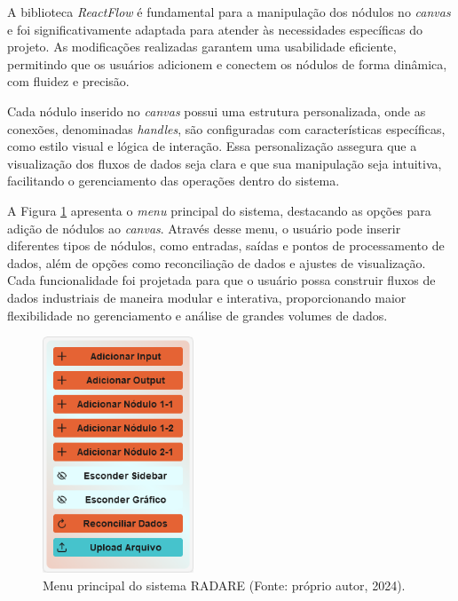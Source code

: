 A biblioteca \textit{ReactFlow} \cite{reactflow} é fundamental para a manipulação dos nódulos no \textit{canvas} e foi significativamente adaptada para atender às necessidades específicas do projeto. As modificações realizadas garantem uma usabilidade eficiente, permitindo que os usuários adicionem e conectem os nódulos de forma dinâmica, com fluidez e precisão.

Cada nódulo inserido no \textit{canvas} possui uma estrutura personalizada, onde as conexões, denominadas \textit{handles}, são configuradas com características específicas, como estilo visual e lógica de interação. Essa personalização assegura que a visualização dos fluxos de dados seja clara e que sua manipulação seja intuitiva, facilitando o gerenciamento das operações dentro do sistema.

A Figura \ref{Fig:MenuImage} apresenta o \textit{menu} principal do sistema, destacando as opções para adição de nódulos ao \textit{canvas}. Através desse menu, o usuário pode inserir diferentes tipos de nódulos, como entradas, saídas e pontos de processamento de dados, além de opções como reconciliação de dados e ajustes de visualização. Cada funcionalidade foi projetada para que o usuário possa construir fluxos de dados industriais de maneira modular e interativa, proporcionando maior flexibilidade no gerenciamento e análise de grandes volumes de dados.

\begin{figure}[htbp]
    \centering
    \includegraphics[width=0.4\textwidth]{figuras/menu-image.png}
    \caption{Menu principal do sistema RADARE (Fonte: próprio autor, 2024).}
    \label{Fig:MenuImage}
\end{figure}

